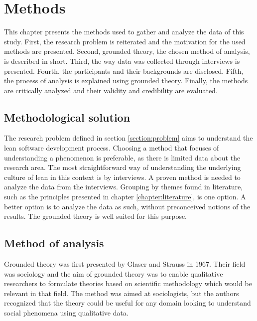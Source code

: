 
\chapter{Methods}
\label{chapter:methods}


This chapter presents the methods used to gather and analyze the data of this study. First, the research problem is reiterated and the motivation for the used methods are presented. Second, grounded theory, the chosen method of analysis, is described in short. Third, the way data was collected through interviews is presented. Fourth, the participants and their backgrounds are disclosed. Fifth, the process of analysis is explained using grounded theory. Finally, the methods are critically analyzed and their validity and credibility are evaluated.

\section{Methodological solution}
\label{section:methodsolution}


The research problem defined in section \ref{section:problem} aims to understand the lean software development process. Choosing a method that focuses of understanding a phenomenon is preferable, as there is limited data about the research area. The most straightforward way of understanding the underlying culture of lean in this context is by interviews. A proven method is needed to analyze the data from the interviews. Grouping by themes found in literature, such as the principles presented in chapter \ref{chapter:literature}, is one option. A better option is to analyze the data as such, without preconceived notions of the results. The grounded theory is well suited for this purpose.

\section{Method of analysis}
\label{section:methodanalysis}


Grounded theory was first presented by Glaser and Strauss in 1967. Their field was sociology and the aim of grounded theory was to enable qualitative researchers to formulate theories based on scientific methodology which would be relevant in that field. The method was aimed at sociologists, but the authors recognized that the theory could be useful for any domain looking to understand social phenomena using qualitative data. \cite{glaser1967discovery}

